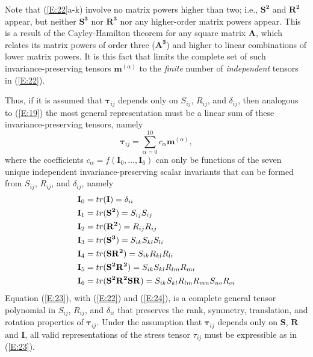 Note that (\ref{E:22}a-k) involve no matrix powers higher than two; i.e., $\mathbf{S^2}$ and $\mathbf{R^2}$  appear, but neither $\mathbf{S^3}$  nor $\mathbf{R^3}$  nor any higher-order matrix powers appear. This is a result of the Cayley-Hamilton theorem for any square matrix $\mathbf{A}$, which relates its matrix powers of order three ($\mathbf{A^3}$) and higher to linear combinations of lower matrix powers. It is this fact that limits the complete set of such invariance-preserving tensors  $\mathbf{m}^{(\alpha)}$  to the \textit{finite} number of \textit{independent} tensors in (\ref{E:22}).

Thus, if it is assumed that $\mathbf{\tau}_{ij}$  depends only on $S_{ij}$, $R_{ij}$, and $\delta_{ij}$, then analogous to (\ref{E:19}) the most general representation must be a linear sum of these invariance-preserving tensors, namely
%
\begin{equation}
\label{E:23}
	\mathbf{\tau}_{ij} = \sum_{\alpha=0}^{10} c_{\alpha} \mathbf{m}^{(\alpha)},
\end{equation}
%
%   
where the coefficients $c_{\alpha} = f(\mathbf{I}_0, \ldots, \mathbf{I}_6)$  can only be functions of the seven unique independent invariance-preserving scalar invariants that can be formed from $S_{ij}$, $R_{ij}$, and $\delta_{ij}$, namely
%
\begin{subequations}
\label{E:24} \vspace{-0.33in}
\begin{align}
 	\mathbf{I}_{0} &= tr(\mathbf{I})   = \delta_{ii} \\
	\mathbf{I}_{1} &= tr(\mathbf{S^2}) = S_{ij}S_{ij} \\
	\mathbf{I}_{2} &= tr(\mathbf{R^2}) = R_{ij}R_{ij} \\
	\mathbf{I}_{3} &= tr(\mathbf{S^3}) = S_{ik}S_{kl}S_{li} \\
	\mathbf{I}_{4} &= tr(\mathbf{SR^2}) = S_{ik}R_{kl}R_{li} \\ 
	\mathbf{I}_{5} &= tr(\mathbf{S^2R^2}) = S_{ik}S_{kl}R_{lm}R_{mi} \\ 
	\mathbf{I}_{6} &= tr(\mathbf{S^2R^2SR}) = S_{ik}S_{kl}R_{lm}R_{mn}S_{no}R_{oi} 
\end{align}
\end{subequations}
%
%    
Equation (\ref{E:23}), with (\ref{E:22}) and (\ref{E:24}), is a complete general tensor polynomial in $S_{ij}$, $R_{ij}$, and $\delta_{ii}$ that preserves the rank, symmetry, translation, and rotation properties of $\mathbf{\tau}_{ij}$.  Under the assumption that $\mathbf{\tau}_{ij}$  depends only on $\mathbf{S}$, $\mathbf{R}$ and $\mathbf{I}$, all valid representations of the stress tensor $\tau_{ij}$  must be expressible as in (\ref{E:23}).

